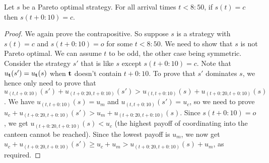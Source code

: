 \begin{lemma}\label{lemma:canteen-propagate} 
Let $s$ be a Pareto optimal strategy. For all arrival times $t < 8{:}50$, if $s(t)= c$ then $s(t+0{:}10) = c$.
\end{lemma}
\begin{proof}
  We again prove the contrapositive. So suppose
$s$ is a strategy with $s(t) = c$ and $s(t+0{:}10) = o$ for some $t < 8{:}50$. We need to show that $s$ is not Pareto optimal. We can assume $t$ to be odd, the other case being symmetric. Consider the strategy $s'$ that is like $s$ except $s(t+0{:}10) = c$. Note that $u_{\bf t}(s') = u_{\bf t}(s)$ when $\bf t$ doesn't contain $t+0{:}10$. To prove that $s'$ dominates $s$, we hence only need to prove that $u_{(t,t+0{:}10)}(s') + u_{(t+0{:}20,t+0{:}10)}(s') > u_{(t,t+0{:}10)}(s) + u_{(t+0{:}20,t+0{:}10)}(s)$.
We have $u_{(t,t+0{:}10)}(s) = u_m$ and $u_{(t,t+0{:}10)}(s') = u_c$, so we need to prove $u_c + u_{(t+0{:}20,t+0{:}10)}(s') > u_m + u_{(t+0{:}20,t+0{:}10)}(s)$. Since $s(t+0{:}10) = o$, we get $u_{(t+0{:}20,t+0{:}10)}(s) < u_c$ (the highest payoff of coordinating into the canteen cannot be reached). Since the lowest payoff is $u_m$, we now get $u_c + u_{(t+0{:}20,t+0{:}10)}(s') \geq u_c + u_m > u_{(t+0{:}20,t+0{:}10)}(s) + u_m$, as required.
%
\end{proof}

